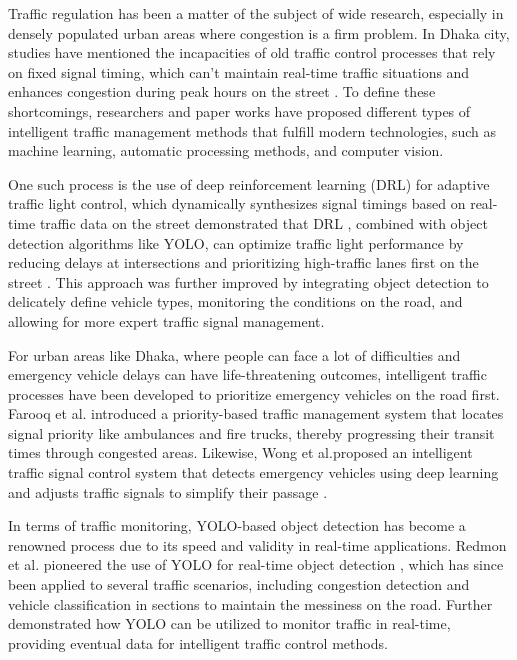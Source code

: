 \documentclass[conference]{IEEEtran}
\begin{document}
Traffic regulation has been a matter of the subject of wide research, especially in densely populated urban areas where congestion is a firm problem. In Dhaka city, studies have mentioned the incapacities of old traffic control processes that rely on fixed signal timing, which can't maintain real-time traffic situations and enhances congestion during peak hours on the street \cite{clar:a5}. To define these shortcomings, researchers and paper works have proposed different types of intelligent traffic management methods that fulfill modern technologies, such as machine learning, automatic processing methods, and computer vision.


One such process is the use of deep reinforcement learning (DRL) for adaptive traffic light control, which dynamically synthesizes signal timings based on real-time traffic data on the street demonstrated that DRL \cite{clar:a6}, combined with object detection algorithms like YOLO, can optimize traffic light performance by reducing delays at intersections and prioritizing high-traffic lanes first on the street \cite{clar:a15}. This approach was further improved by integrating object detection to delicately define vehicle types, monitoring the conditions on the road, and allowing for more expert traffic signal management.


For urban areas like Dhaka, where people can face a lot of difficulties and emergency vehicle delays can have life-threatening outcomes, intelligent traffic processes have been developed to prioritize emergency vehicles on the road first. Farooq et al. introduced a priority-based traffic management system that locates signal priority like ambulances and fire trucks, thereby progressing their transit times through congested areas. Likewise, Wong et al.proposed an intelligent traffic signal control system that detects emergency vehicles using deep learning and adjusts traffic signals to simplify their passage \cite{clar:a8}.


In terms of traffic monitoring, YOLO-based object detection has become a renowned process due to its speed and validity in real-time applications. Redmon et al. pioneered the use of YOLO for real-time object detection \cite{clar:a14}, which has since been applied to several traffic scenarios, including congestion detection and vehicle classification in sections to maintain the messiness on the road. Further demonstrated how YOLO can be utilized to monitor traffic in real-time, providing eventual data for intelligent traffic control methods.
\end{document}
